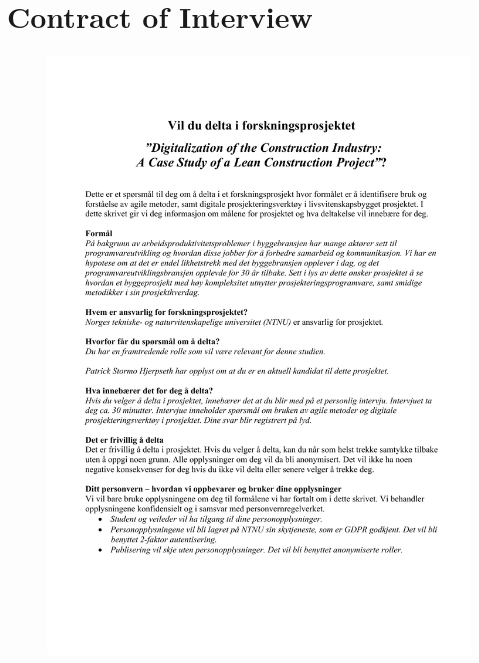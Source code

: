 \chapter{Contract of Interview} \label{apx:contract}

\begin{figure}
    \centering
    \includegraphics[width=\textwidth]{appendix/kontrakt.pdf}
\end{figure}
